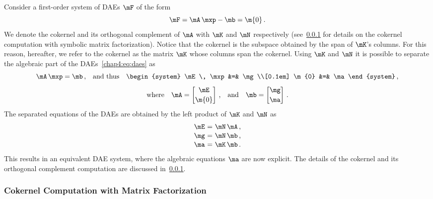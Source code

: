 Consider a first-order system of \acp{DAE} $\mF$ of the form
%
\begin{equation}
  \label{chap4:eq:daes}
  \mF = \mA \, \mxp - \mb = \m{0} \, \text{.}
\end{equation}
%
We denote the cokernel and its orthogonal complement of $\mA$ with $\mK$ and $\mN$ respectively (see~\ref{chap4:sec:cokernel} for details on the cokernel computation with symbolic matrix factorization). Notice that the cokernel is the subspace obtained by the span of $\mK$'s columns. For this reason, hereafter, we refer to the cokernel as the matrix $\mK$ whose columns span the cokernel. Using $\mK$ and $\mN$ it is possible to separate the algebraic part of the \acp{DAE}~\eqref{chap4:eq:daes} as
%
\begin{equation}
  \label{chap4:eq:separated_daes}
  \mA \, \mxp = \mb \, \text{,} \quad \text{and thus} \quad \begin{system}
    \mE \, \mxp &=& \mg \\[0.1em]
    \m{0}       &=& \ma
  \end{system} \, \text{,}
\end{equation}
\begin{equation*}
  \text{where} \quad \mA = \begin{bmatrix}
    \mE \\[0.2em]
    \m{0}
  \end{bmatrix} \, \text{,}
  \quad \text{and} \quad
  \mb = \begin{bmatrix}
     \mg \\[0.2em]
     \ma
  \end{bmatrix} \, \text{.}
\end{equation*}
%
The separated equations of the \acp{DAE} are obtained by the left product of $\mK$ and $\mN$ as
%
\begin{equation*}
  \begin{array}{r@{~}c@{~}l}
    \mE &=& \mN \, \mA \, \text{,} \\[0.1em]
    \mg &=& \mN \, \mb \, \text{,} \\[0.1em]
    \ma &=& \mK \, \mb \, \text{.}
  \end{array}
\end{equation*}
%
This results in an equivalent \ac{DAE} system, where the algebraic equations $\ma$ are now explicit. The details of the cokernel and its orthogonal complement computation are discussed in~\ref{chap4:sec:cokernel}.


\subsubsection{Cokernel Computation with Matrix Factorization}
\label{chap4:sec:cokernel}

